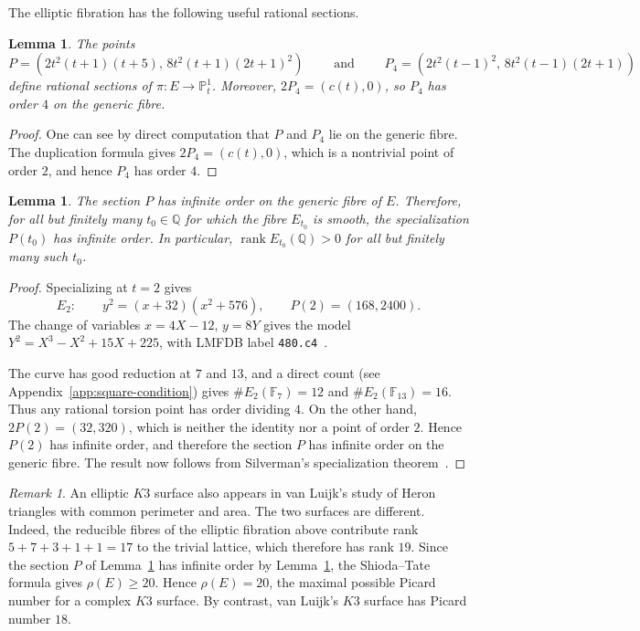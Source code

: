 \documentclass[11pt]{amsart}
\theoremstyle{plain}
\newtheorem{lem}[thm]{Lemma}
\theoremstyle{remark}
\newtheorem{rem}[thm]{Remark}
\theoremstyle{plain}
\newcommand{\Q}{\mathbb{Q}}
\begin{document}
The elliptic fibration has the following useful rational sections.

\begin{lem}\label{lem:k3-sections}
The points
\[
P=
\left(
2t^2(t+1)(t+5),\,
8t^2(t+1)(2t+1)^2
\right) \qquad \mbox{ and }\qquad
P_4=
\left(
2t^2(t-1)^2,\,
8t^2(t-1)(2t+1)
\right)
\]
define rational sections of $\pi:E\to\mathbb P^1_t$. Moreover,
$2P_4=(c(t),0)$, so $P_4$ has order $4$ on the generic fibre.
\end{lem}

\begin{proof}
One can see by direct computation that $P$ and $P_4$ lie on the generic fibre. The duplication formula gives $2P_4=(c(t),0)$, which is
a nontrivial point of order $2$, and hence $P_4$ has order $4$.
\end{proof}

\begin{lem}\label{lem:k3-positive-rank}
The section $P$ has infinite order on the generic fibre of $E$.
Therefore, for all but finitely many $t_0\in\Q$ for which the fibre
$E_{t_0}$ is smooth, the specialization $P(t_0)$ has infinite order.
In particular, $\operatorname{rank}E_{t_0}(\Q)>0$ for all but finitely
many such $t_0$.
\end{lem}

\begin{proof}
Specializing at $t=2$ gives
\[
E_2:\qquad y^2=(x+32)(x^2+576),
\qquad
P(2)=(168,2400).
\]
The change of variables $x=4X-12$, $y=8Y$ gives the model
$Y^2=X^3-X^2+15X+225$, with LMFDB label
\texttt{480.c4}~\cite{lmfdb}.

The curve has good reduction at $7$ and $13$, and a direct count
(see Appendix~\ref{app:square-condition}) gives
$\#E_2(\mathbb F_7)=12$ and $\#E_2(\mathbb F_{13})=16$. Thus any
rational torsion point has order dividing $4$. On the other hand,
$2P(2)=(32,320)$, which is neither the identity nor a point of order
$2$. Hence $P(2)$ has infinite order, and therefore the section $P$
has infinite order on the generic fibre. The result now follows from
Silverman's specialization theorem~\cite{Silverman1983}.
\end{proof}


\begin{rem}
An elliptic $K3$ surface also appears in van Luijk's study
\cite{vL07} of Heron triangles with common perimeter and area. The two
surfaces are different. Indeed, the reducible fibres of the elliptic
fibration above contribute rank
$5+7+3+1+1=17$
to the trivial lattice, which therefore has rank $19$. Since the
section $P$ of Lemma~\ref{lem:k3-sections} has infinite order by
Lemma~\ref{lem:k3-positive-rank}, the Shioda--Tate formula gives
$\rho(E)\geq20$. Hence $\rho(E)=20$, the maximal possible Picard
number for a complex $K3$ surface. By contrast, van Luijk's $K3$
surface has Picard number $18$.
\end{rem}
\end{document}
